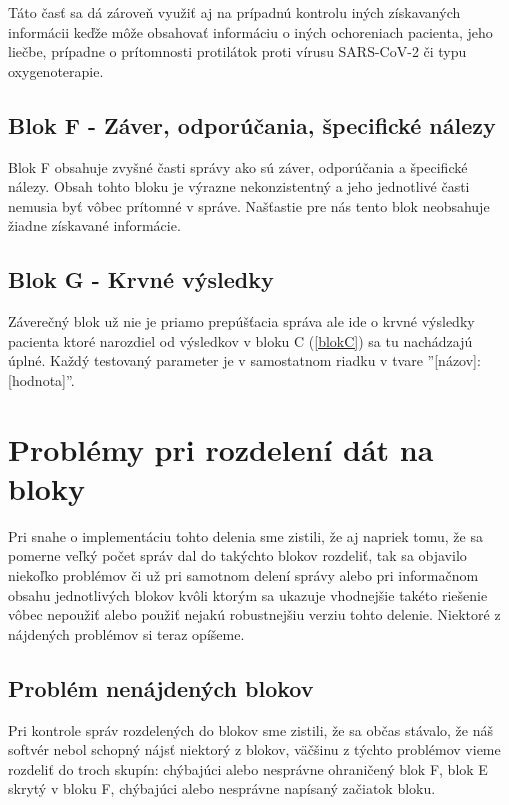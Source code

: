 Táto časť sa dá zároveň využiť aj na prípadnú kontrolu iných získavaných informácii keďže môže obsahovať informáciu o iných ochoreniach pacienta, jeho liečbe, prípadne o prítomnosti protilátok proti vírusu SARS-CoV-2 či typu oxygenoterapie.

\subsection{Blok F - Záver, odporúčania, špecifické nálezy}

Blok F obsahuje zvyšné časti správy ako sú záver, odporúčania a špecifické nálezy. Obsah tohto bloku je výrazne nekonzistentný a jeho jednotlivé časti nemusia byť vôbec prítomné v správe. Našťastie pre nás tento blok neobsahuje žiadne získavané informácie.

\subsection{Blok G - Krvné výsledky}
\label{blokG}
Záverečný blok už nie je priamo prepúšťacia správa ale ide o krvné výsledky pacienta ktoré narozdiel od výsledkov v bloku C (\ref{blokC}) sa tu nachádzajú úplné. Každý testovaný parameter je v samostatnom riadku v tvare ''[názov]: [hodnota]''.

\section{Problémy pri rozdelení dát na bloky} 

Pri snahe o implementáciu tohto delenia sme zistili, že aj napriek tomu, že sa pomerne veľký počet správ dal do takýchto blokov rozdeliť, tak sa objavilo niekoľko problémov či už pri samotnom delení správy alebo pri informačnom obsahu jednotlivých blokov kvôli ktorým sa ukazuje vhodnejšie takéto riešenie vôbec nepoužiť alebo použiť nejakú robustnejšiu verziu tohto delenie. Niektoré z nájdených problémov si teraz opíšeme.

\subsection{Problém nenájdených blokov}

Pri kontrole správ rozdelených do blokov sme zistili, že sa občas stávalo, že náš softvér nebol schopný nájsť niektorý z blokov, väčšinu z týchto problémov vieme rozdeliť do troch skupín: chýbajúci alebo nesprávne ohraničený blok F, blok E skrytý v bloku F, chýbajúci alebo nesprávne napísaný začiatok bloku.

